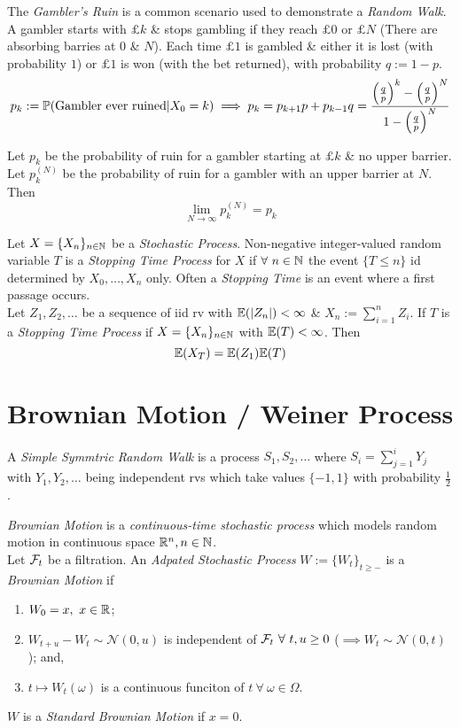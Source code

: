 \documentclass[11pt,a4paper]{article}
\begin{document}
The \textit{Gambler's Ruin} is a common scenario used to demonstrate a \textit{Random Walk}. A gambler starts with $\pounds k$ \& stops gambling if they reach $\pounds 0$ or $\pounds N$ (\ie There are absorbing barries at $0$ \& $N$). Each time $\pounds 1$ is gambled \& either it is lost (with probability $1$) or $\pounds 1$ is won (with the bet returned), with probability $q:=1-p$.
$$p_k:=\prob(\mathrm{Gambler\ ever\ ruined}|X_0=k)\implies p_k=p_{k+1}p+p_{k-1}q=\frac{\left(\frac{q}{p}\right)^k-\left(\frac{q}{p}\right)^N}{1-\left(\frac{q}{p}\right)^N}$$

Let $p_k$ be the probability of ruin for a gambler starting at $\pounds k$ \& no upper barrier. Let $p_k^{(N)}$ be the probability of ruin for a gambler with an upper barrier at $N$. Then
$$\lim_{N\to\infty}p_k^{(N)}=p_k$$

Let $X=\{X_n\}_{n\in\mathbb{N}}$ be a \textit{Stochastic Process}. Non-negative integer-valued random variable $T$ is a \textit{Stopping Time Process} for $X$ if $\forall\ n\in\mathbb{N}$ the event $\{T\leq n\}$ id determined by $X_0,\dots,X_n$ only. Often a \textit{Stopping Time} is an event where a first passage occurs.\\

Let $Z_1,Z_2,\dots$ be a sequence of iid rv with $\mathbb{E}(|Z_n|)<\infty$ \& $X_n:=\sum_{i=1}^nZ_i$. If $T$ is a \textit{Stopping Time Process} if $X=\{X_n\}_{n\in\mathbb{N}}$ with $\mathbb{E}(T)<\infty$. Then
$$\mathbb{E}(X_T)=\mathbb{E}(Z_1)\mathbb{E}(T)$$

\section{Brownian Motion / Weiner Process}

A \textit{Simple Symmtric Random Walk} is a process $S_1,S_2,\dots$ where $S_i=\sum_{j=1}^iY_j$ with $Y_1,Y_2,\dots$ being independent rvs which take values $\{-1,1\}$ with probability $\frac{1}{2}$.

\textit{Brownian Motion} is a \textit{continuous-time stochastic process} which models random motion in continuous space $\mathbb{R}^n,n\in\mathbb{N}$.\\
Let $\mathcal{F}_t$ be a filtration. An \textit{Adpated Stochastic Process} $W:=\{W_t\}_{t\geq-}$ is a \textit{Brownian Motion} if
\begin{enumerate}
	\item $W_0=x,\ x\in\mathbb{R}$;
	\item $W_{t+u}-W_t\sim\mathcal{N}(0,u)$ is independent of $\sigmafield_t\ \forall\ t,u\geq0$ ($\implies W_t\sim\mathcal{N}(0,t)$); and,
	\item $t\mapsto W_t(\omega)$ is a continuous funciton of $t\ \forall\ \omega\in\Omega$.
\end{enumerate}
\nb $W$ is a \textit{Standard Brownian Motion} if $x=0$.\\
\end{document}
